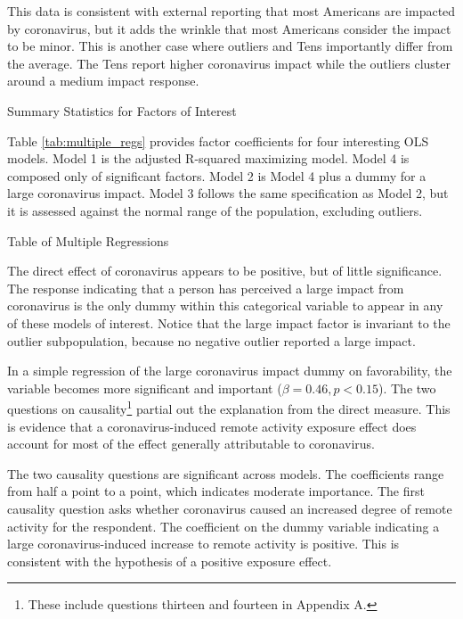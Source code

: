 \documentclass[review]{elsarticle}
\begin{document}
This data is consistent with external reporting that most Americans are impacted by coronavirus\cite{demographic2020},
but it adds the wrinkle that most Americans consider the impact to be minor.
This is another case where outliers and Tens importantly differ from the average.
The Tens report higher coronavirus impact while the outliers cluster around a medium impact response.

\begin{table}
    \caption{Summary Statistics for Factors of Interest}
    \resizebox{\columnwidth}{!}{
        
    }
    \label{tab:desc_stats}
\end{table}

Table \ref{tab:multiple_regs} provides factor coefficients for four interesting OLS models.
Model 1 is the adjusted R-squared maximizing model.
Model 4 is composed only of significant factors.
Model 2 is Model 4 plus a dummy for a large coronavirus impact.
Model 3 follows the same specification as Model 2,
but it is assessed against the normal range of the population, excluding outliers.

\begin{table}
    \caption{Table of Multiple Regressions}
    \resizebox{\columnwidth}{!}{
        
    }
    \label{tab:multiple_regs}
\end{table}

The direct effect of coronavirus appears to be positive, but of little significance.
The response indicating that a person has perceived a large impact from coronavirus is the only dummy
within this categorical variable to appear in any of these models of interest.
Notice that the large impact factor is invariant to the outlier subpopulation,
because no negative outlier reported a large impact.

In a simple regression of the large coronavirus impact dummy on favorability,
the variable becomes more significant and important ($\beta = 0.46, p < 0.15$).
The two questions on causality\footnote{These include questions thirteen and fourteen in Appendix A.}
partial out the explanation from the direct measure.
This is evidence that a coronavirus-induced remote activity exposure effect does account for most of the effect generally attributable to coronavirus.

The two causality questions are significant across models.
The coefficients range from half a point to a point, which indicates moderate importance.
The first causality question asks whether coronavirus caused an increased degree of remote activity for the respondent.
The coefficient on the dummy variable indicating a large coronavirus-induced increase to remote activity is positive.
This is consistent with the hypothesis of a positive exposure effect.
\end{document}
